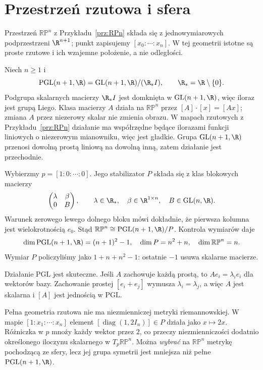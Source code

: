 \section{Przestrzeń rzutowa i sfera}
\label{sec:klein-rzutowa-sfera}

Przestrzeń $\mathbb{RP}^n$ z Przykładu~\ref{prz:RPn}
składa się z jednowymiarowych podprzestrzeni $\R^{n+1}$;
punkt zapisujemy $[x_0:\cdots:x_n]$. W tej geometrii istotne
są proste rzutowe i ich wzajemne położenie, a nie odległości.

\begin{przyklad}
\label{prz:klein-rzutowa}
Niech $n\geq1$ i
\[
 \mathrm{PGL}(n+1,\R)
 =\mathrm{GL}(n+1,\R)/(\R_*I),
 \qquad \R_*=\R\setminus\{0\}.
\]
Podgrupa skalarnych macierzy $\R_*I$ jest domknięta
w $\mathrm{GL}(n+1,\R)$, więc iloraz jest grupą Liego.
Klasa macierzy $A$ działa na $\mathbb{RP}^n$ przez
$[A]\cdot[x]=[Ax]$; zmiana $A$ przez niezerowy skalar
nie zmienia obrazu. W mapach rzutowych z
Przykładu~\ref{prz:RPn} działanie ma współrzędne będące
ilorazami funkcji liniowych o niezerowym mianowniku,
więc jest gładkie. Grupa $\mathrm{GL}(n+1,\R)$ przenosi
dowolną prostą liniową na dowolną inną, zatem działanie
jest przechodnie.

Wybierzmy $p=[1:0:\cdots:0]$. Jego stabilizator $P$
składa się z klas blokowych macierzy
\[
 \begin{pmatrix}\lambda&\beta\\0&B\end{pmatrix},
 \qquad \lambda\in\R_*,\quad
 \beta\in\R^{1\times n},\quad B\in\mathrm{GL}(n,\R).
\]
Warunek zerowego lewego dolnego bloku mówi dokładnie,
że pierwsza kolumna jest wielokrotnością $e_0$.
Stąd $\mathbb{RP}^n\cong\mathrm{PGL}(n+1,\R)/P$.
Kontrola wymiarów daje
\[
 \dim\mathrm{PGL}(n+1,\R)=(n+1)^2-1,
 \quad \dim P=n^2+n,
 \quad \dim\mathbb{RP}^n=n.
\]
Wymiar $P$ policzyliśmy jako
$1+n+n^2-1$: ostatnie $-1$ usuwa skalarne macierze.

Działanie $\mathrm{PGL}$ jest skuteczne. Jeśli $A$ zachowuje
każdą prostą, to $Ae_i=\lambda_i e_i$ dla wektorów bazy.
Zachowanie prostej $[e_i+e_j]$ wymusza
$\lambda_i=\lambda_j$, a więc $A$ jest skalarna i
$[A]$ jest jednością w $\mathrm{PGL}$.

Pełna geometria rzutowa nie ma niezmienniczej metryki
riemannowskiej. W mapie $[1:x_1:\cdots:x_n]$ element
$[\operatorname{diag}(1,2I_n)]\in P$ działa jako
$x\mapsto2x$. Różniczka w $p$ mnoży każdy wektor przez
$2$, co przeczy niezmienniczości dodatnio określonego
iloczynu skalarnego w $T_p\mathbb{RP}^n$. Można
\emph{wybrać} na $\mathbb{RP}^n$ metrykę pochodzącą ze
sfery, lecz jej grupa symetrii jest mniejsza niż pełne
$\mathrm{PGL}(n+1,\R)$.
\end{przyklad}


